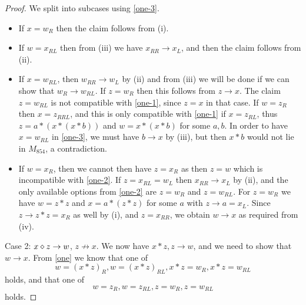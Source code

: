 \begin{proof}
We split into subcases using \eqref{one-3}.
\begin{itemize}
  \item If $x = w_R$ then the claim follows from (i).
  \item If $w = x_{RL}$ then from (iii) we have $x_{RR} \to x_L$, and then the claim follows from (ii).
  \item If $x = w_{RL}$, then $w_{RR} \to w_L$ by (ii) and from (iii) we will be done if we can show that $w_R \to w_{RL}$.  If $z = w_R$ then this follows from $z \to x$.  The claim $z = w_{RL}$ is not compatible with \eqref{one-1}, since $z=x$ in that case. If $w = z_R$ then $x = z_{RRL}$, and this is only compatible with \eqref{one-1} if $x = z_{RL}$, thus $z = a * (x * (x * b))$ and $w = x  * (x * b)$ for some $a,b$.  In order to have $x = w_{RL}$ in \eqref{one-3}, we must have $b \to x$ by (iii), but then $x*b$ would not lie in $M_{854}$, a contradiction.
  \item If $w = x_R$, then we cannot then have $z = x_R$ as then $z=w$ which is incompatible with \eqref{one-2}.  If $z = x_{RL} = w_L$ then $x_{RR} \to x_L$ by (ii), and the only available options from \eqref{one-2} are $z = w_R$ and $z = w_{RL}$.  For $z=w_R$ we have $w = z * z$ and $x = a * (z * z)$ for some $a$ with $z \to a = x_L$.  Since $z \to z*z = x_R$ as well by (i), and $z = x_{RR}$, we obtain $w \to x$ as required from (iv).
\end{itemize}

Case 2: $x \diamond z \to w$, $z \not \to x$.  We now have $x * z, z \to w$, and we need to show that $w \to x$.  From \eqref{one} we know that one of
\begin{equation}\label{wz-1}
 w = (x * z)_R, w = (x * z)_{RL}, x * z = w_R, x * z = w_{RL}
\end{equation}
holds, and that one of
\begin{equation}\label{wz}
  w =  z_R, w = z_{RL}, z = w_R, z = w_{RL}
\end{equation}
holds.


\end{proof}
